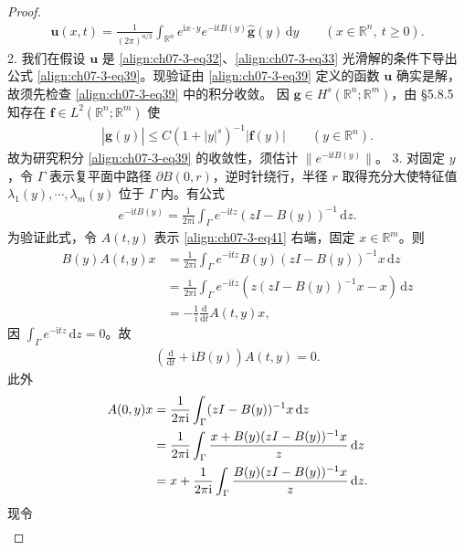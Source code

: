 \documentclass[../../main.tex]{subfiles}
\begin{document}
\begin{theorem}[解的存在性]
\begin{proof}
\begin{align}
\mathbf{u}(x,t)=\frac1{(2\pi)^{n/2}}\int_{\mathbb{R}^n}e^{\mathrm{i}x\cdot y}e^{-\mathrm{i}tB(y)}\widehat{\mathbf{g}}(y)\,\mathrm{d}y\qquad (x\in\mathbb{R}^n,\ t\geqslant 0).\label{align:ch07-3-eq39}
\end{align}
2. 我们在假设 $\mathbf{u}$ 是 \eqref{align:ch07-3-eq32}、\eqref{align:ch07-3-eq33} 光滑解的条件下导出公式 \eqref{align:ch07-3-eq39}。现验证由 \eqref{align:ch07-3-eq39} 定义的函数 $\mathbf{u}$ 确实是解，故须先检查 \eqref{align:ch07-3-eq39} 中的积分收敛。
因 $\mathbf{g}\in H^s(\mathbb{R}^n;\mathbb{R}^m)$，由 \S5.8.5 知存在 $\mathbf{f}\in L^2(\mathbb{R}^n;\mathbb{R}^m)$ 使
\begin{align}
|\widehat{\mathbf{g}}(y)|\leqslant C(1+|y|^s)^{-1}|\mathbf{f}(y)|\qquad (y\in\mathbb{R}^n).\label{align:ch07-3-eq40}
\end{align}
故为研究积分 \eqref{align:ch07-3-eq39} 的收敛性，须估计 $\|e^{-\mathrm{i}tB(y)}\|$。
3. 对固定 $y$，令 $\Gamma$ 表示复平面中路径 $\partial B(0,r)$，逆时针绕行，半径 $r$ 取得充分大使特征值 $\lambda_1(y),\cdots,\lambda_m(y)$ 位于 $\Gamma$ 内。有公式
\begin{align}
e^{-\mathrm{i}tB(y)}=\frac1{2\pi\mathrm{i}}\int_\Gamma e^{-\mathrm{i}tz}(zI-B(y))^{-1}\,\mathrm{d}z.\label{align:ch07-3-eq41}
\end{align}
为验证此式，令 $A(t,y)$ 表示 \eqref{align:ch07-3-eq41} 右端，固定 $x\in\mathbb{R}^m$。则
\begin{align*}
B(y)A(t,y)x&=\frac1{2\pi\mathrm{i}}\int_\Gamma e^{-\mathrm{i}tz}B(y)(zI-B(y))^{-1}x\,\mathrm{d}z\\
&=\frac1{2\pi\mathrm{i}}\int_\Gamma e^{-\mathrm{i}tz}\left(z(zI-B(y))^{-1}x-x\right)\,\mathrm{d}z\\
&=-\frac1{\mathrm{i}}\frac{\mathrm{d}}{\mathrm{d}t}A(t,y)x,
\end{align*}
因 $\int_\Gamma e^{-\mathrm{i}tz}\,\mathrm{d}z=0$。故
\begin{align}
\left(\frac{\mathrm{d}}{\mathrm{d}t}+\mathrm{i}B(y)\right)A(t,y)=0.\label{align:ch07-3-eq42}
\end{align}
此外
\begin{align}
A(0,y)x&=\frac1{2\pi\mathrm{i}}\int_\Gamma(zI-B(y))^{-1}x\,\mathrm{d}z\notag\\
&=\frac1{2\pi\mathrm{i}}\int_\Gamma\frac{x+B(y)(zI-B(y))^{-1}x}{z}\,\mathrm{d}z\notag\\
&=x+\frac1{2\pi\mathrm{i}}\int_\Gamma\frac{B(y)(zI-B(y))^{-1}x}{z}\,\mathrm{d}z.\label{align:ch07-3-eq43}
\end{align}
现令
\begin{align}

\end{align}
\end{proof}
\end{theorem}
\end{document}
